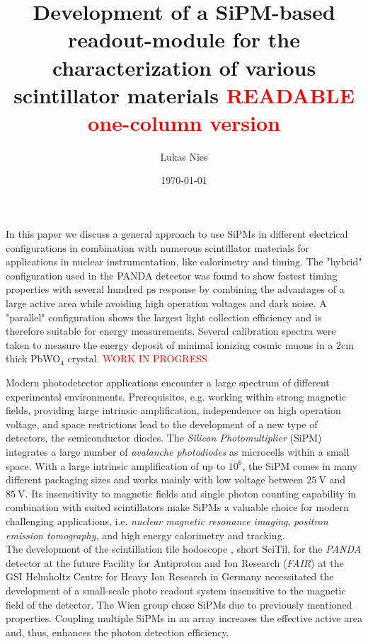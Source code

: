 \documentclass[12pt]{article}
\newcommand{\tit}[1]{\textit{#1}}
\newcommand{\pwo}{PbWO$_4$}
\begin{document}
	
	\title{
		\textbf{Development of a SiPM-based readout-module for the characterization of various scintillator materials \textcolor{red}{READABLE one-column version} }
	}
	\author{Lukas Nies}
	\date{\today	
	}
	\clearpage\maketitle\thispagestyle{empty}

	\setcounter{page}{0}

In this paper we discuss a general approach to use SiPMs in different electrical configurations in combination with numerous scintillator materials for applications in nuclear instrumentation, like calorimetry and timing. The "hybrid" configuration used in the PANDA detector was found to show fastest timing properties with several hundred $\si{\pico\second}$ response by combining the advantages of a large active area while avoiding high operation voltages and dark noise. A "parallel" configuration shows the largest light collection efficiency and is therefore suitable for energy measurements. Several calibration spectra were taken to measure the energy deposit of minimal ionizing cosmic muons in a $2\si{\centi\meter}$ thick \pwo{} crystal. \textcolor{red}{WORK IN PROGRESS} \par 
Modern photodetector applications encounter a large spectrum of different experimental environments. Prerequisites, e.g. working within strong magnetic fields, providing large intrinsic amplification, independence on high operation voltage, and space restrictions lead to the development of a new type of detectors, the semiconductor diodes. The \tit{Silicon Photomultiplier} (SiPM) integrates a large number of \tit{avalanche photodiodes} as microcells within a small space. With a large intrinsic amplification of up to $10^6$, the SiPM comes in many different packaging sizes and works mainly with low voltage between $\SI{25}{\volt}$ and $\SI{85}{\volt}$. Its insensitivity to magnetic fields and single photon counting capability in combination with suited scintillators make SiPMs a valuable choice for modern challenging applications, i.e. \tit{nuclear magnetic resonance imaging}, \tit{positron emission tomography}, and high energy calorimetry and tracking. \\ \indent
The development of the scintillation tile hodoscope \cite{SciTil}, short SciTil, for the \tit{PANDA} detector at the future Facility for Antiproton and Ion Research (\tit{FAIR}) at the GSI Helmholtz Centre for Heavy Ion Research in Germany \cite{FAIR} necessitated the development of a small-scale photo readout system insensitive to the magnetic field of the detector. The Wien group chose SiPMs due to previously mentioned properties. Coupling multiple SiPMs in an array increases the effective active area and, thus, enhances the photon detection efficiency. \\ \indent
\end{document}
